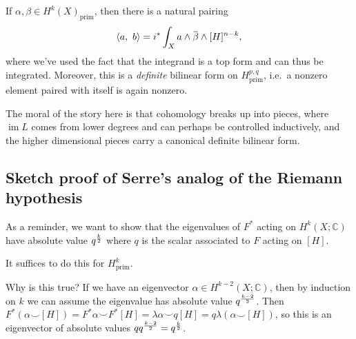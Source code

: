 \begin{theorem}

If \(\alpha, \beta \in H^k(X)_{\text{prim}}\), then there is a natural
pairing
\begin{align*}  
{\left\langle {a},~{b} \right\rangle} = i^* \int_X a\wedge \mkern 1.5mu\overline{\mkern-1.5mu\beta\mkern-1.5mu}\mkern 1.5mu \wedge [H]^{n-k}
,\end{align*}
where we've used the fact that the integrand is a top form and can thus
be integrated. Moreover, this is a \emph{definite} bilinear form on
\(H^{p, q}_{\text{prim}}\), i.e.~a nonzero element paired with itself is
again nonzero.

\end{theorem}

The moral of the story here is that cohomology breaks up into pieces,
where \(\operatorname{im}L\) comes from lower degrees and can perhaps be
controlled inductively, and the higher dimensional pieces carry a
canonical definite bilinear form.

\hypertarget{sketch-proof-of-serres-analog-of-the-riemann-hypothesis}{%
\subsection{Sketch proof of Serre's analog of the Riemann
hypothesis}\label{sketch-proof-of-serres-analog-of-the-riemann-hypothesis}}

As a reminder, we want to show that the eigenvalues of \(F^*\) acting on
\(H^k(X; {\mathbb{C}})\) have absolute value \(q^{k\over 2}\) where
\(q\) is the scalar associated to \(F\) acting on \([H]\).

\begin{claim}

It suffices to do this for \(H^k_{\text{prim}}\).

\end{claim}

Why is this true? If we have an eigenvector
\(\alpha\in H^{k-2}(X; {\mathbb{C}})\), then by induction on \(k\) we
can assume the eigenvalue has absolute value \(q^{k-2 \over 2}\). Then
\(F^*(\alpha \smile [H]) = F^* \alpha \smile F^*[H] = \lambda \alpha \smile q[H] = q\lambda (\alpha \smile [H])\),
so this is an eigenvector of absolute values
\(q q^{k-2\over 2} = q^{k\over 2}\).

